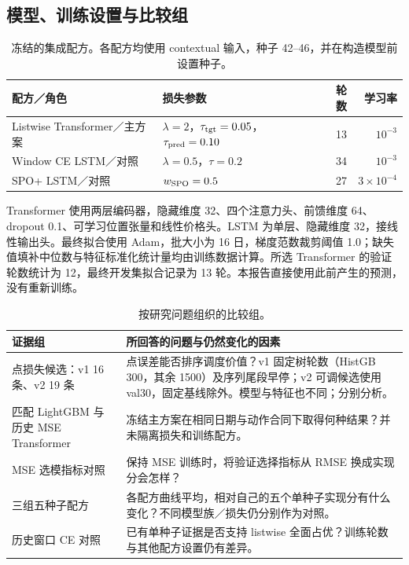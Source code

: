 \documentclass[11pt,a4paper]{article}
\begin{document}
\subsection{模型、训练设置与比较组}
\begin{table}[!htbp]\centering\small
\caption{冻结的集成配方。各配方均使用 contextual 输入，种子 42--46，并在构造模型前设置种子。}\label{tab:config}
\begin{tabularx}{\linewidth}{@{}p{.28\linewidth}Xrr@{}}\toprule
配方／角色 & 损失参数 & 轮数 & 学习率 \\\midrule
Listwise Transformer／主方案 & $\lambda=2$，$\tau_{\rm tgt}=0.05$，$\tau_{\rm pred}=0.10$ & 13 & $10^{-3}$ \\
Window CE LSTM／对照 & $\lambda=0.5$，$\tau=0.2$ & 34 & $10^{-3}$ \\
SPO+ LSTM／对照 & $w_{\rm SPO}=0.5$ & 27 & $3\times10^{-4}$ \\\bottomrule
\end{tabularx}\end{table}
Transformer 使用两层编码器，隐藏维度 32、四个注意力头、前馈维度 64、dropout 0.1、可学习位置张量和线性价格头。LSTM 为单层、隐藏维度 32，接线性输出头。最终拟合使用 Adam，批大小为 16 日，梯度范数裁剪阈值 1.0；缺失值填补中位数与特征标准化统计量均由训练数据计算。所选 Transformer 的验证轮数统计为 12，最终开发集拟合记录为 13 轮。本报告直接使用此前产生的预测，没有重新训练。

\begin{table}[!htbp]\centering\small
\caption{按研究问题组织的比较组。}\label{tab:groups}
\begin{tabularx}{\linewidth}{@{}p{.28\linewidth}X@{}}\toprule
证据组 & 所回答的问题与仍然变化的因素 \\\midrule
点损失候选：v1 16 条、v2 19 条 & 点误差能否排序调度价值？v1 固定树轮数（HistGB 300，其余 1500）及序列尾段早停；v2 可调候选使用 val30，固定基线除外。模型与特征也不同；分别分析。 \\
匹配 LightGBM 与历史 MSE Transformer & 冻结主方案在相同日期与动作合同下取得何种结果？并未隔离损失和训练配方。 \\
MSE 选模指标对照 & 保持 MSE 训练时，将验证选择指标从 RMSE 换成实现分会怎样？ \\
三组五种子配方 & 各配方曲线平均，相对自己的五个单种子实现分有什么变化？不同模型族／损失仍分别作为对照。 \\
历史窗口 CE 对照 & 已有单种子证据是否支持 listwise 全面占优？训练轮数与其他配方设置仍有差异。 \\\bottomrule
\end{tabularx}\end{table}
\end{document}
